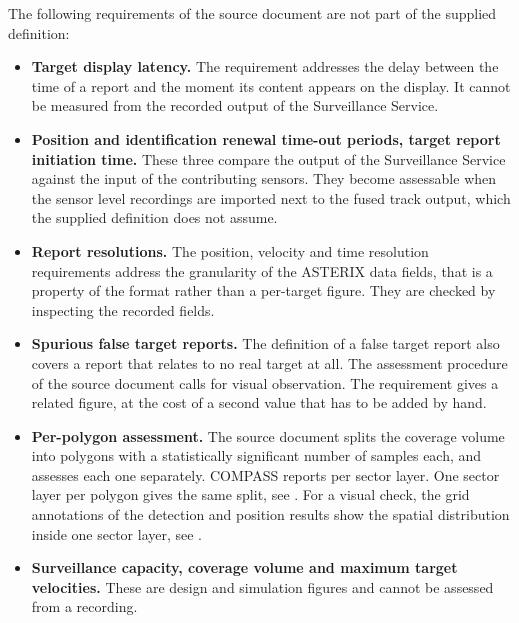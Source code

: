 The following requirements of the source document are not part of the supplied definition:
\begin{itemize}
\item \textbf{Target display latency.} The requirement addresses the delay between the time of a report and the moment its content appears on the display. It cannot be measured from the recorded output of the Surveillance Service.
\item \textbf{Position and identification renewal time-out periods, target report initiation time.} These three compare the output of the Surveillance Service against the input of the contributing sensors. They become assessable when the sensor level recordings are imported next to the fused track output, which the supplied definition does not assume.
\item \textbf{Report resolutions.} The position, velocity and time resolution requirements address the granularity of the ASTERIX data fields, that is a property of the format rather than a per-target figure. They are checked by inspecting the recorded fields.
\item \textbf{Spurious false target reports.} The definition of a false target report also covers a report that relates to no real target at all. The assessment procedure of the source document calls for visual observation. The  requirement gives a related figure, at the cost of a second value that has to be added by hand.
\item \textbf{Per-polygon assessment.} The source document splits the coverage volume into polygons with a statistically significant number of samples each, and assesses each one separately. COMPASS reports per sector layer. One sector layer per polygon gives the same split, see . For a visual check, the grid annotations of the detection and position results show the spatial distribution inside one sector layer, see .
\item \textbf{Surveillance capacity, coverage volume and maximum target velocities.} These are design and simulation figures and cannot be assessed from a recording.
\end{itemize}
